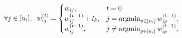 

\begin{equation}
\begin{aligned}
\forall j \in [u_i], \;\;
w^{(t)}_{ij} =
\begin{cases}
w_{ij}, \qquad \qquad \, t=0 \\
w^{(t-1)}_{ij} + l_k,
\;\;\; j = \operatorname*{argmin}_{p \in [u_i]} w^{(t-1)}_{ip}, \\
w^{(t-1)}_{ij},
\qquad \;\;\; j \neq \operatorname*{argmin}_{p \in [u_i]} w^{(t-1)}_{ip},
\end{cases}
\end{aligned}
\end{equation}

